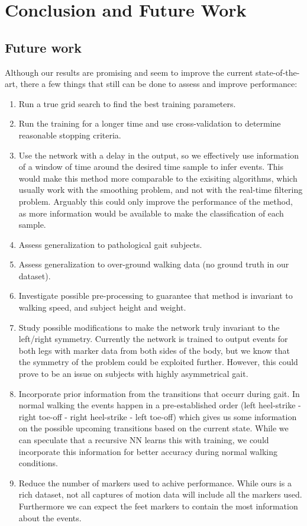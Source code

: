\documentclass{acm_proc_article-sp}
\begin{document}
\section{Conclusion and Future Work}
\label{sec:Conclusion and Future Work}

\subsection{Future work}
Although our results are promising and seem to improve the current state-of-the-art, there a few things that still can be done to assess and improve performance:
\begin{enumerate}
 \item Run a true grid search to find the best training parameters.
 \item Run the training for a longer time and use cross-validation to determine reasonable stopping criteria.
 \item Use the network with a delay in the output, so we effectively use information of a window of time around the desired time sample to infer events. This would make this method more comparable to the exisiting algorithms, which usually work with the smoothing problem, and not with the real-time filtering problem. Arguably this could only improve the performance of the method, as more information would be available to make the classification of each sample.
 \item Assess generalization to pathological gait subjects.
 \item Assess generalization to over-ground walking data (no ground truth in our dataset).
 \item Investigate possible pre-processing to guarantee that method is invariant to walking speed, and subject height and weight.
 \item Study possible modifications to make the network truly invariant to the left/right symmetry. Currently the network is trained to output events for both legs with marker data from both sides of the body, but we know that the symmetry of the problem could be exploited further. However, this could prove to be an issue on subjects with highly asymmetrical gait.
 \item Incorporate prior information from the transitions that occurr during gait. In normal walking the events happen in a pre-established order (left heel-strike - right toe-off - right heel-strike - left toe-off) which gives us some information on the possible upcoming transitions based on the current state. While we can speculate that a recursive NN learns this with training, we could incorporate this information for better accuracy during normal walking conditions.
 \item Reduce the number of markers used to achive performance. While ours is a rich dataset, not all captures of motion data will include all the markers used. Furthermore we can expect the feet markers to contain the most information about the events.
\end{enumerate}
\end{document}
